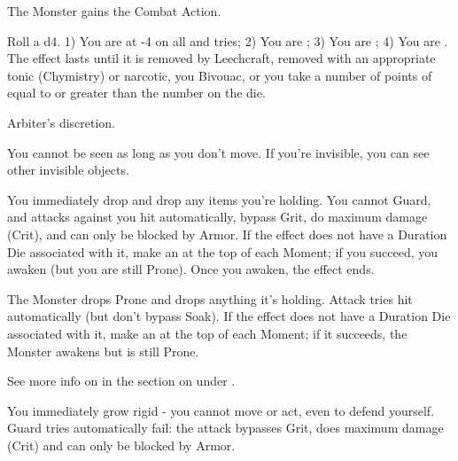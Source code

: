 \begin{multicols*}{2}
     The Monster gains the  Combat Action.


  Roll a d4.  1) You are at -4 on all \RO and \RB tries;  2) You are ;  3) You are ; 4) You are .  The effect lasts until it is removed by Leechcraft, removed with an appropriate tonic (Chymistry) or narcotic, you Bivouac, or you take a number of points of  equal to or greater than the number on the die.

     Arbiter's discretion.

\cbreak



  You cannot be seen as long as you don't move.  If you're invisible, you can see other invisible objects.


  You immediately drop  and drop any items you're holding.  You cannot Guard, and attacks against you hit automatically, bypass Grit, do maximum damage (Crit), and can only be blocked by Armor.  If the effect does not have a Duration Die associated with it, make an \RSTRY{\VIG} at the top of each Moment; if you succeed, you awaken (but you are still Prone).  Once you awaken, the effect ends.

     The Monster drops Prone and drops anything it's holding.  Attack tries hit automatically (but don't bypass Soak). If the effect does not have a Duration Die associated with it, make an \RSTRY{\VIG} at the top of each Moment; if it succeeds, the Monster awakens but is still Prone.  




  See more info on  in the section on  under .





  You immediately grow rigid - you cannot move or act, even to defend yourself.  Guard tries automatically fail: the attack bypasses Grit, does maximum damage (Crit) and can only be blocked by Armor.  


\end{multicols*}
